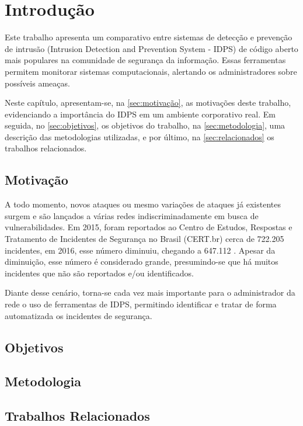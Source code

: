 \chapter{Introdução} \label{ch:introdução}
Este trabalho apresenta um comparativo entre sistemas de detecção e prevenção de intrusão (Intrusion Detection and Prevention System - IDPS) de código aberto mais populares na comunidade de segurança da informação. Essas ferramentas permitem monitorar sistemas computacionais, alertando os administradores sobre possíveis ameaças.

Neste capítulo, apresentam-se, na \autoref{sec:motivação}, as motivações deste trabalho, evidenciando a importância do IDPS em um ambiente corporativo real. Em seguida, no \autoref{sec:objetivos}, os objetivos do trabalho, na \autoref{sec:metodologia}, uma descrição das metodologias utilizadas, e por último, na \autoref{sec:relacionados} os trabalhos relacionados.

\section{Motivação} \label{sec:motivação} 

A todo momento, novos ataques ou mesmo variações de ataques já existentes surgem e são lançados a várias redes indiscriminadamente em busca de vulnerabilidades. Em 2015, foram reportados ao Centro de Estudos, Respostas e Tratamento de Incidentes de Segurança no Brasil (CERT.br) cerca de 722.205 incidentes, em 2016, esse número diminuiu, chegando a 647.112 \cite{estatistica:cert.br}. Apesar da diminuição, esse número é considerado grande, presumindo-se que há muitos incidentes que não são reportados e/ou identificados.

Diante desse cenário, torna-se cada vez mais importante para o administrador da rede o uso de ferramentas de IDPS, permitindo identificar e tratar de forma automatizada os incidentes de segurança.

\section{Objetivos} \label{sec:objetivos}
\section{Metodologia} \label{sec:metodologia}
\section{Trabalhos Relacionados} \label{sec:relacionados}

